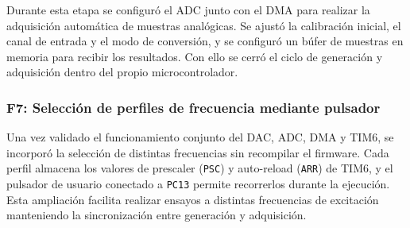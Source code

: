 \documentclass[11pt,a4paper]{article}
\begin{document}
Durante esta etapa se configuró el ADC junto con el DMA para realizar la adquisición automática de muestras analógicas. Se ajustó la calibración inicial, el canal de entrada y el modo de conversión, y se configuró un búfer de muestras en memoria para recibir los resultados. Con ello se cerró el ciclo de generación y adquisición dentro del propio microcontrolador.



\subsubsection{F7: Selección de perfiles de frecuencia mediante pulsador}

Una vez validado el funcionamiento conjunto del DAC, ADC, DMA y TIM6, se incorporó la selección de distintas frecuencias sin recompilar el firmware. Cada perfil almacena los valores de prescaler (\texttt{PSC}) y auto-reload (\texttt{ARR}) de TIM6, y el pulsador de usuario conectado a \texttt{PC13} permite recorrerlos durante la ejecución. Esta ampliación facilita realizar ensayos a distintas frecuencias de excitación manteniendo la sincronización entre generación y adquisición.



\end{document}
